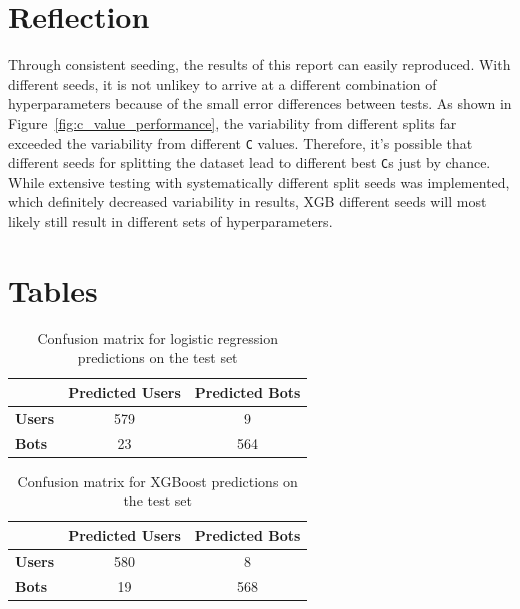 \documentclass[twocolumn]{article}
\begin{document}
\section{Reflection}

Through consistent seeding, the results of this report can easily reproduced. With different seeds, it is not unlikey to arrive at a different combination of hyperparameters because of the small error differences between tests. As shown in Figure~\ref{fig:c_value_performance}, the variability from different splits far exceeded the variability from different \texttt{C} values. Therefore, it's possible that different seeds for splitting the dataset lead to different best \texttt{C}s just by chance. While extensive testing with systematically different split seeds was implemented, which definitely decreased variability in results, XGB different seeds will most likely still result in different sets of hyperparameters.

\printbibliography

\onecolumn
\appendix
\newpage

\section{Tables}
\renewcommand{\thetable}{A.\arabic{table}}
\setcounter{table}{0}

\begin{table}[H]
\centering
\caption{Confusion matrix for logistic regression predictions on the test set}
\label{tab:log_confusion}
\begin{tabular}{lcc}
\toprule
 & \textbf{Predicted Users} & \textbf{Predicted Bots} \\
\midrule
\textbf{Users} & 579 & 9 \\
\textbf{Bots} & 23  & 564 \\
\bottomrule
\end{tabular}
\end{table}

\begin{table}[H]
\centering
\caption{Confusion matrix for XGBoost predictions on the test set}
\label{tab:xgb_confusion}
\begin{tabular}{lcc}
\toprule
 & \textbf{Predicted Users} & \textbf{Predicted Bots} \\
\midrule
\textbf{Users} & 580 & 8 \\
\textbf{Bots} & 19  & 568 \\
\bottomrule
\end{tabular}
\end{table}
\end{document}
